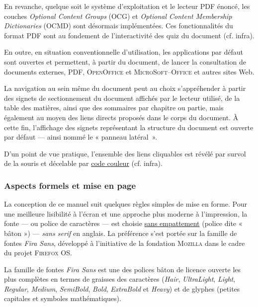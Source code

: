En revanche, quelque soit le système d'exploitation et le lecteur PDF énoncé, les couches \textit{Optional Content Groups} (OCG) et \textit{Optional Content Membership Dictionaries} (OCMD) sont désormais implémentées. Ces fonctionnalités du format PDF sont au fondement de l'interactivité des quiz du document (cf. infra).

En outre, en situation conventionnelle d'utilisation, les applications par défaut sont ouvertes et permettent, à partir du document, de lancer la consultation de documents externes, PDF, \textsc{OpenOffice} et \textsc{MicroSoft--Office} et autres sites Web.

La navigation au sein même du document peut au choix s'appréhender à partir des signets de sectionnement du document affichés par le lecteur utilisé, de la table des matières, ainsi que des sommaires par chapitre ou partie, mais également au moyen des liens directs proposés dans le corps du document. À cette fin, l'affichage des signets représentant la structure du document est ouverte par défaut --- ainsi nommé le « panneau latéral~».

D'un point de vue pratique, l'ensemble des liens cliquables est révélé par survol de la souris et décelable par \href{https://fr.wikipedia.org/wiki/Liste_de_noms_de_couleur}{code couleur} (cf. infra).


\subsubsection*{Aspects formels et mise en page}

La conception de ce manuel suit quelques règles simples de mise en forme. Pour une meilleure lisibilité à l'écran et une approche plus moderne à l'impression, la fonte --- ou police de caractères --- est choisie \href{https://fr.wikipedia.org/wiki/Empattement_(typographie)}{sans empattement} (police dite « bâton ») --- \textit{sans serif} en anglais. La préférence s'est portée sur la famille de fontes \textit{Fira Sans}, développé à l'initiative de la fondation \textsc{Mozilla} dans le cadre du projet \textsc{Firefox OS}.

La famille de fontes \textit{Fira Sans} est une des polices bâton de licence ouverte les plus complètes en termes de graisses des caractères (\textit{Hair}, \textit{UltraLight}, \textit{Light}, \textit{Regular}, \textit{Medium}, \textit{SemiBold}, \textit{Bold}, \textit{ExtraBold} et \textit{Heavy}) et de glyphes (petites capitales et symboles mathématiques).

